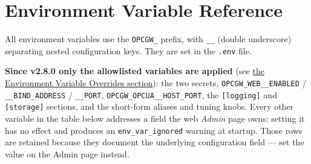 \chapter{Environment Variable Reference}\label{app-env-reference}

All environment variables use the \texttt{OPCGW\_} prefix, with \texttt{\_\_} (double underscore) separating nested configuration keys. They are set in the \texttt{.env} file.

\textbf{Since v2.8.0 only the allowlisted variables are applied} (see \hyperref[sec-config-env-overrides]{the Environment Variable Overrides section}): the two secrets, \texttt{OPCGW\_WEB\_\_ENABLED} / \texttt{\_\_BIND\_ADDRESS} / \texttt{\_\_PORT}, \texttt{OPCGW\_OPCUA\_\_HOST\_PORT}, the \texttt{[logging]} and \texttt{[storage]} sections, and the short-form aliases and tuning knobs. Every other variable in the table below addresses a field the web \emph{Admin} page owns: setting it has no effect and produces an \texttt{env\_var\_ignored} warning at startup. Those rows are retained because they document the underlying configuration field --- set the value on the Admin page instead.


